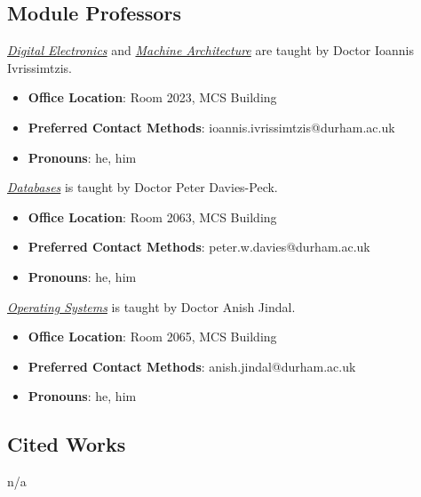 \subsection{Module Professors}

\hyperref[cs:section:1.de]{\textit{Digital Electronics}} and \hyperref[cs:section:2.ma]{\textit{Machine Architecture}} are taught by Doctor Ioannis Ivrissimtzis.
\begin{itemize}
    \item \textbf{Office Location}: Room 2023, MCS Building
    \item \textbf{Preferred Contact Methods}: ioannis.ivrissimtzis@durham.ac.uk
    \item \textbf{Pronouns}: he, him
\end{itemize}
    
\hyperref[cs:section:3.db]{\textit{Databases}} is taught by Doctor Peter Davies-Peck.
\begin{itemize}
    \item \textbf{Office Location}: Room 2063, MCS Building
    \item \textbf{Preferred Contact Methods}: peter.w.davies@durham.ac.uk
    \item \textbf{Pronouns}: he, him
\end{itemize}
    
\hyperref[cs:section:4.os]{\textit{Operating Systems}} is taught by Doctor Anish Jindal.
\begin{itemize}
    \item \textbf{Office Location}: Room 2065, MCS Building
    \item \textbf{Preferred Contact Methods}: anish.jindal@durham.ac.uk
    \item \textbf{Pronouns}: he, him
\end{itemize}

\subsection{Cited Works}

n/a